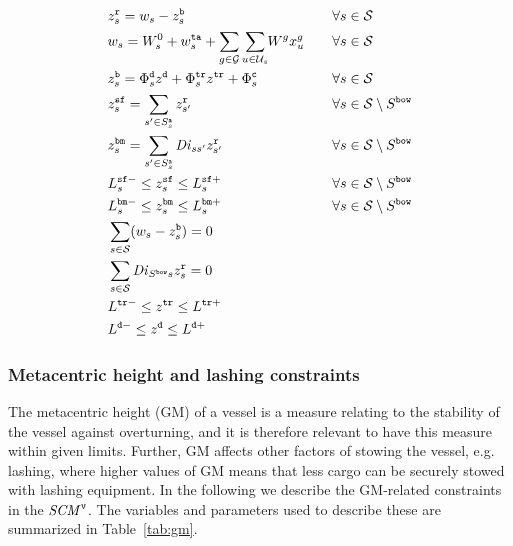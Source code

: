 \begin{alignat}{3}    
& z^{\ttt{r}}_{s} = w_{s} - z^{\ttt{b}}_{s}														&& \forall s\in\mc{S} \label{defResF} \\
& w_{s} = W^{0}_{s} + w^{\ttt{ta}}_{s} + \sum_{g\in \mc{G}} \so[r]{\sum_{u\in \mc{U}_s}}W^g x^{g}_{u} \quad
																																			&& \forall s\in\mc{S} \label{defW} \\
& z^{\ttt{b}}_{s} = \Phi^{\ttt{d}}_{s} z^\ttt{d} + \Phi^{\ttt{tr}}_{s} z^\ttt{tr} + \Phi^{\ttt{c}}_{s} 	
																																			&& \forall s\in\mc{S} \label{defBancy} \\
%                                                                             
& z^{\ttt{sf}}_{s} = \sum_{s'\in S^\ttt{a}_s} z^{\ttt{r}}_{s'}				&& \forall s\in\mc{S}\setminus S^\ttt{bow} \label{defShear} \\
& z^\ttt{bm}_s = \sum_{s'\in S^\ttt{a}_s} \mi{Di}_{ss'} z^\ttt{r}_{s'}&& \forall s\in\mc{S}\setminus S^\ttt{bow} \label{defBending} \\
& L^{\ttt{sf}-}_{s} \leq z^{\ttt{sf}}_{s} \leq L^{\ttt{sf}+}_{s}		 	&& \forall s\in\mc{S}\setminus S^\ttt{bow} \label{limitsShear} \\    
& L^{\ttt{bm}-}_{s} \leq z^{\ttt{bm}}_{s} \leq L^{\ttt{bm}+}_{s}  		&& \forall s\in\mc{S}\setminus S^\ttt{bow} \label{limitsBending}\\
& \sum_{s\in\mc{S}} (w_{s}-z^\ttt{b}_s)  = 0													&& \label{noShearAtEnds} \\
& \sum_{s\in\mc{S}} \mi{Di}_{S^\ttt{bow}s} z^{\ttt{r}}_{s} = 0				&& \label{noMomentAtStern}\\
& L^{\ttt{tr}-}  		\leq z^\ttt{tr}    		\leq L^{\ttt{tr}+}					&& \label{trimLimits} \\
& L^{\ttt{d}-}	   	\leq z^\ttt{d}     		\leq L^{\ttt{d}+}						&& \label{draftLimits}
\end{alignat}

\subsubsection{Metacentric height and lashing constraints}
The metacentric height (GM) of a vessel is a measure relating to the stability of the vessel against overturning, and it is therefore relevant to have this measure within given limits. Further, GM affects other factors of stowing the vessel, e.g. lashing, where {higher} values of GM means that less cargo can be securely stowed with lashing equipment. In the following we describe the GM-related constraints in the $\mathit{SCM}^\texttt{v}$. The variables and parameters used to describe these are summarized in Table~\ref{tab:gm}.

